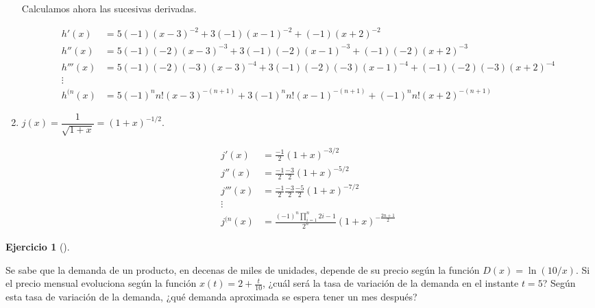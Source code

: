 \documentclass[
  a4paper,
]{scrreport}
\theoremstyle{definition}
\newtheorem{exercise}{Ejercicio}[chapter]
\theoremstyle{remark}
\begin{document}
\begin{tcolorbox}
\begin{enumerate}
  Calculamos ahora las sucesivas derivadas.

  \begin{align*}
   h'(x) & = 5(-1)(x-3)^{-2}+3(-1)(x-1)^{-2}+(-1)(x+2)^{-2}\\ 
   h''(x) &= 5(-1)(-2)(x-3)^{-3}+3(-1)(-2)(x-1)^{-3}+(-1)(-2)(x+2)^{-3}\\
   h'''(x) &= 5(-1)(-2)(-3)(x-3)^{-4}+3(-1)(-2)(-3)(x-1)^{-4}+(-1)(-2)(-3)(x+2)^{-4}\\
   \vdots \\ 
   h^{(n}(x) &= 5(-1)^n n!(x-3)^{-(n+1)}+ 3(-1)^n n!(x-1)^{-(n+1)} + (-1)^n n!(x+2)^{-(n+1)}
   \end{align*}
\item
  \(j(x)=\dfrac{1}{\sqrt{1+x}}=(1+x)^{-1/2}\).

  \begin{align*}
   j'(x) &= \frac{-1}{2}(1+x)^{-3/2}\\ 
   j''(x) &= \frac{-1}{2}\frac{-3}{2}(1+x)^{-5/2}\\ 
   j'''(x) &= \frac{-1}{2}\frac{-3}{2}\frac{-5}{2}(1+x)^{-7/2}\\ 
   \vdots \\ 
   j^{(n}(x) &= \frac{(-1)^n \prod_{i=1}^{n}2i-1}{2^n}(1+x)^{-\frac{2n+1}{2}}
   \end{align*}
\end{enumerate}

\end{tcolorbox}

\leavevmode{}%
\begin{exercise}[]\label{exr-regla-cadena-1}

Se sabe que la demanda de un producto, en decenas de miles de unidades,
depende de su precio según la función \(D(x)=\ln(10/x)\). Si el precio
mensual evoluciona según la función \(x(t)=2+\frac{t}{10}\), ¿cuál será
la tasa de variación de la demanda en el instante \(t=5\)? Según esta
tasa de variación de la demanda, ¿qué demanda aproximada se espera tener
un mes después?

\end{exercise}
\end{document}
